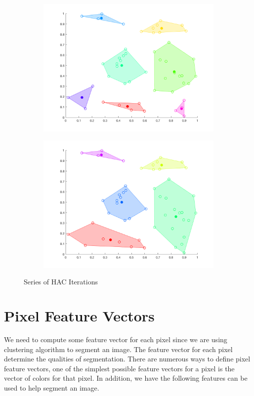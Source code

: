 \documentclass[12pt]{article}
\begin{document}
\begin{figure}[t!]
\begin{subfigure}[b]{0.3\textwidth}
    \end{subfigure}
    \begin{subfigure}[b]{0.3\textwidth}
        \includegraphics[width=\textwidth]{ha_11}
    \end{subfigure}
    \begin{subfigure}[b]{0.3\textwidth}
        \includegraphics[width=\textwidth]{ha_12}
    \end{subfigure}
    \caption{Series of HAC Iterations}\label{fig:HAC}
\end{figure}

\section{Pixel Feature Vectors}
We need to compute some feature vector for each pixel since we are using clustering algorithm to segment an image. The feature vector for each pixel determine the qualities of segmentation. There are numerous ways to define pixel feature vectors, one of the simplest possible feature vectors for a pixel is the vector of colors for that pixel. In addition, we have the following features can be used to help segment an image.
\end{document}

